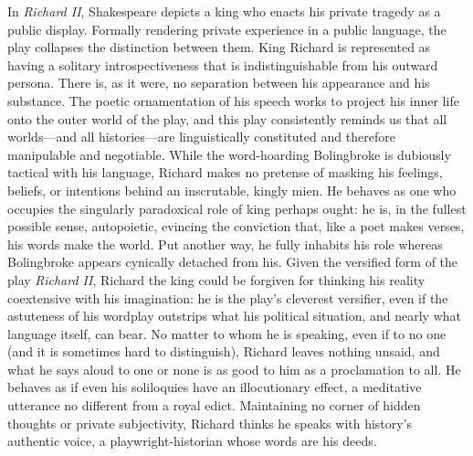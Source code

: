 In \emph{Richard II}, Shakespeare depicts a king who enacts his private tragedy as a public display.
Formally rendering private experience in a public language, the play collapses the distinction between them.
King Richard is represented as having a solitary introspectiveness that is indistinguishable from his outward persona.
There is, as it were, no separation between his appearance and his substance.
The poetic ornamentation of his speech works to project his inner life onto the outer world of the play, and this play consistently reminds us that all worlds---and all histories---are linguistically constituted and therefore manipulable and negotiable.
While the word-hoarding Bolingbroke is dubiously tactical with his language, Richard makes no pretense of masking his feelings, beliefs, or intentions behind an inscrutable, kingly mien.
He behaves as one who occupies the singularly paradoxical role of king perhaps ought: he is, in the fullest possible sense, autopoietic, evincing the conviction that, like a poet makes verses, his words make the world.
Put another way, he fully inhabits his role whereas Bolingbroke appears cynically detached from his.
Given the versified form of the play \emph{Richard II}, Richard the king could be forgiven for thinking his reality coextensive with his imagination: he is the play's cleverest versifier, even if the astuteness of his wordplay outstrips what his political situation, and nearly what language itself, can bear.
No matter to whom he is speaking, even if to no one (and it is sometimes hard to distinguish), Richard leaves nothing unsaid, and what he says aloud to one or none is as good to him as a proclamation to all.
He behaves as if even his soliloquies have an illocutionary effect, a meditative utterance no different from a royal edict.
Maintaining no corner of hidden thoughts or private subjectivity, Richard thinks he speaks with history's authentic voice, a playwright-historian whose words are his deeds.

